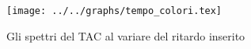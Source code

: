 \begin{figure}[h] \centering\texttt{[image: ../../graphs/tempo\_colori.tex]}\caption{Gli spettri del TAC al variare del ritardo inserito }\label{gr:tempo_colori} \end{figure}
